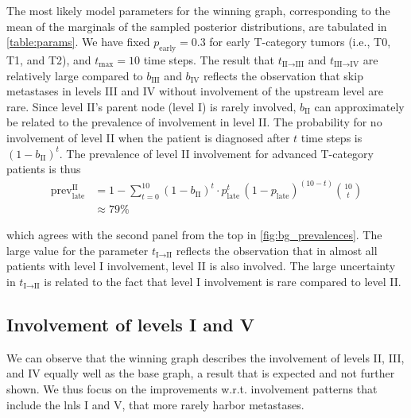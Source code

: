 \documentclass[twocolumn]{aastex631}
\begin{document}
The most likely model parameters for the winning graph, corresponding to the mean of the marginals of the sampled posterior distributions, are tabulated in \autoref{table:params}. We have fixed $p_\text{early}=0.3$ for early T-category tumors (i.e., T0, T1, and T2), and $t_\text{max}=10$ time steps. The result that $t_{\text{II} \rightarrow \text{III}}$ and $t_{\text{III} \rightarrow \text{IV}}$ are relatively large compared to $b_\text{III}$ and $b_\text{IV}$ reflects the observation that skip metastases in levels III and IV without involvement of the upstream level are rare. Since level II's parent node (level I) is rarely involved, $b_\text{II}$ can approximately be related to the prevalence of involvement in level II. The probability for no involvement of level II when the patient is diagnosed after $t$ time steps is $\left(1-b_\text{II}\right)^t$. The prevalence of level II involvement for advanced T-category patients is thus
%
\begin{equation}
    \begin{aligned}
        \text{prev}_\text{late}^\text{II} &= 1-\sum_{t=0}^{10} \left(1-b_\text{II}\right)^t \cdot p_\text{late}^t \, (1-p_\text{late})^{(10-t)}\binom{10}{t} \\
        &\approx 79 \%
    \end{aligned}
\end{equation}

which agrees with the second panel from the top in \autoref{fig:bg_prevalences}. 
The large value for the parameter $t_{\text{I} \rightarrow \text{II}}$ reflects the observation that in almost all patients with level I involvement, level II is also involved. The large uncertainty in $t_{\text{I} \rightarrow \text{II}}$ is related to the fact that level I involvement is rare compared to level II.


\subsection{Involvement of levels I and V}

We can observe that the winning graph describes the involvement of levels II, III, and IV equally well as the base graph, a result that is expected and not further shown. We thus focus on the improvements w.r.t. involvement patterns that include the \glspl{lnl} I and V, that more rarely harbor metastases.
\end{document}
